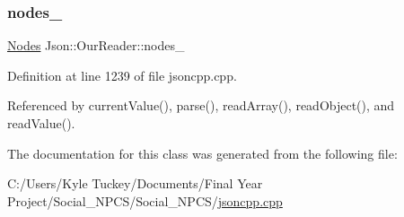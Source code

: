 \subsubsection{\texorpdfstring{nodes\+\_\+}{nodes\_}}
{\footnotesize\ttfamily \hyperlink{class_json_1_1_our_reader_a8480a5ef159cee3a090f96358414d8d3}{Nodes} Json\+::\+Our\+Reader\+::nodes\+\_\+\hspace{0.3cm}{\ttfamily [private]}}



Definition at line 1239 of file jsoncpp.\+cpp.



Referenced by current\+Value(), parse(), read\+Array(), read\+Object(), and read\+Value().



The documentation for this class was generated from the following file\+:\begin{DoxyCompactItemize}
\item 
C\+:/\+Users/\+Kyle Tuckey/\+Documents/\+Final Year Project/\+Social\+\_\+\+N\+P\+C\+S/\+Social\+\_\+\+N\+P\+C\+S/\hyperlink{jsoncpp_8cpp}{jsoncpp.\+cpp}\end{DoxyCompactItemize}
